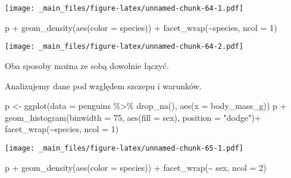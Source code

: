 \documentclass[
]{book}
\newenvironment{Shaded}{\begin{snugshade}}{\end{snugshade}}
\newcommand{\AttributeTok}[1]{\textcolor[rgb]{0.77,0.63,0.00}{#1}}
\newcommand{\DecValTok}[1]{\textcolor[rgb]{0.00,0.00,0.81}{#1}}
\newcommand{\FunctionTok}[1]{\textcolor[rgb]{0.00,0.00,0.00}{#1}}
\newcommand{\NormalTok}[1]{#1}
\newcommand{\OtherTok}[1]{\textcolor[rgb]{0.56,0.35,0.01}{#1}}
\newcommand{\SpecialCharTok}[1]{\textcolor[rgb]{0.00,0.00,0.00}{#1}}
\newcommand{\StringTok}[1]{\textcolor[rgb]{0.31,0.60,0.02}{#1}}
\begin{document}
\texttt{[image: \_main\_files/figure-latex/unnamed-chunk-64-1.pdf]}

\begin{Shaded}
\begin{Highlighting}[]
\NormalTok{p }\SpecialCharTok{+} \FunctionTok{geom\_density}\NormalTok{(}\FunctionTok{aes}\NormalTok{(}\AttributeTok{color =}\NormalTok{ species)) }\SpecialCharTok{+} \FunctionTok{facet\_wrap}\NormalTok{(}\SpecialCharTok{\textasciitilde{}}\NormalTok{species, }\AttributeTok{ncol =} \DecValTok{1}\NormalTok{)}
\end{Highlighting}
\end{Shaded}

\texttt{[image: \_main\_files/figure-latex/unnamed-chunk-64-2.pdf]}

Oba sposoby można ze sobą dowolnie łączyć.

Analizujemy dane pod względem szczepu i warunków.

\begin{Shaded}
\begin{Highlighting}[]
\NormalTok{p }\OtherTok{\textless{}{-}} \FunctionTok{ggplot}\NormalTok{(}\AttributeTok{data =}\NormalTok{ penguins }\SpecialCharTok{\%\textgreater{}\%} \FunctionTok{drop\_na}\NormalTok{(), }\FunctionTok{aes}\NormalTok{(}\AttributeTok{x =}\NormalTok{ body\_mass\_g))}
\NormalTok{p }\SpecialCharTok{+} \FunctionTok{geom\_histogram}\NormalTok{(}\AttributeTok{binwidth =} \DecValTok{75}\NormalTok{, }\FunctionTok{aes}\NormalTok{(}\AttributeTok{fill =}\NormalTok{ sex), }\AttributeTok{position =} \StringTok{"dodge"}\NormalTok{)}\SpecialCharTok{+}
  \FunctionTok{facet\_wrap}\NormalTok{(}\SpecialCharTok{\textasciitilde{}}\NormalTok{species, }\AttributeTok{ncol =} \DecValTok{1}\NormalTok{)}
\end{Highlighting}
\end{Shaded}

\texttt{[image: \_main\_files/figure-latex/unnamed-chunk-65-1.pdf]}

\begin{Shaded}
\begin{Highlighting}[]
\NormalTok{p }\SpecialCharTok{+} \FunctionTok{geom\_density}\NormalTok{(}\FunctionTok{aes}\NormalTok{(}\AttributeTok{color =}\NormalTok{ species)) }\SpecialCharTok{+} \FunctionTok{facet\_wrap}\NormalTok{(}\SpecialCharTok{\textasciitilde{}}\NormalTok{ sex, }\AttributeTok{ncol =} \DecValTok{2}\NormalTok{)}
\end{Highlighting}
\end{Shaded}
\end{document}

